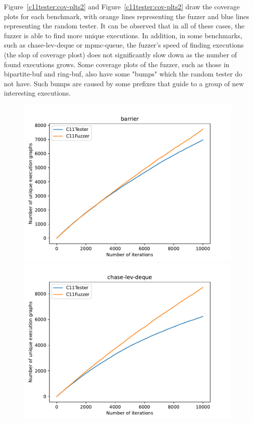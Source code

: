 Figure~\ref{c11tester:cov-plts2} and Figure~\ref{c11tester:cov-plts2} draw the coverage plots for each benchmark, with orange lines representing the fuzzer and blue lines representing the random tester. It can be observed that in all of these cases, the fuzzer is able to find more unique executions. In addition, in some benchmarks, such as chase-lev-deque or mpmc-queue, the fuzzer's speed of finding executions (the slop of coverage plost) does not significantly slow down as the number of found executions grows. Some coverage plots of the fuzzer, such as those in bipartite-buf and ring-buf, also have some "bumps" which the random tester do not have. Such bumps are caused by some prefixes that guide to a group of new interesting executions.

\begin{figure}[H]
    \centering

    \begin{minipage}{0.45\textwidth}
        \centering
        \includegraphics[width=\textwidth]{figure/barrier.pdf}
    \end{minipage}
    \hfill
    \begin{minipage}{0.45\textwidth}
        \centering
        \includegraphics[width=\textwidth]{figure/chase-lev-deque.pdf}
    \end{minipage}


\end{figure}
